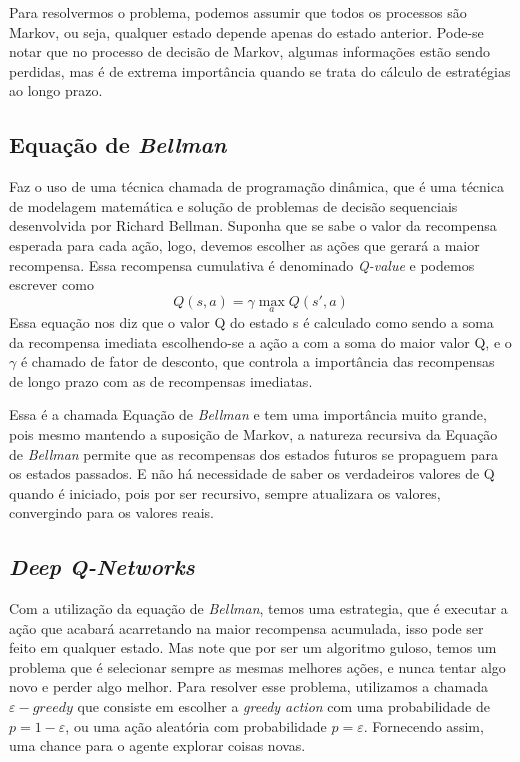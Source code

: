 \documentclass[letterpaper, 10 pt, conference]{ieeeconf}  %
\begin{document}
Para resolvermos o problema, podemos assumir que todos os processos são Markov, ou seja, qualquer estado depende apenas do estado anterior. Pode-se notar que no processo de decisão de Markov, algumas informações estão sendo perdidas, mas é de extrema importância quando se trata do cálculo de estratégias ao longo prazo.

\subsection{Equação de \emph{Bellman}}

Faz o uso de uma técnica chamada de programação dinâmica, que é uma técnica de modelagem matemática e solução de problemas de decisão sequenciais desenvolvida por Richard Bellman. Suponha que se sabe o valor da recompensa esperada para cada ação, logo, devemos escolher as ações que gerará a maior recompensa. Essa recompensa cumulativa é denominado \emph{Q-value} e podemos escrever como
$$Q(s,a)=\gamma \max_a{Q(s',a)}$$
Essa equação nos diz que o valor Q do estado s é calculado como sendo a soma da recompensa imediata escolhendo-se a ação a com a soma do maior valor Q, e o $\gamma$ é chamado de fator de desconto, que controla a importância das recompensas de longo prazo com as de recompensas imediatas.

Essa é a chamada Equação de \emph{Bellman} e tem uma importância muito grande, pois mesmo mantendo a suposição de Markov, a natureza recursiva da Equação de \emph{Bellman} permite que as recompensas dos estados futuros se propaguem para os estados passados. E não há necessidade de saber os verdadeiros valores de Q quando é iniciado, pois por ser recursivo, sempre atualizara os valores, convergindo para os valores reais.

\subsection{\emph{Deep Q-Networks}}

Com a utilização da equação de \emph{Bellman}, temos uma estrategia, que é executar a ação que acabará acarretando na maior recompensa acumulada, isso pode ser feito em qualquer estado. Mas note que por ser um algoritmo guloso, temos um problema que é selecionar sempre as mesmas melhores ações, e nunca tentar algo novo e perder algo melhor. Para resolver esse problema, utilizamos a chamada \emph{$\varepsilon-greedy$} que consiste em escolher a \emph{greedy action} com uma probabilidade de $p=1-\varepsilon$, ou uma ação aleatória com probabilidade $p=\varepsilon$. Fornecendo assim, uma chance para o agente explorar coisas novas.
\end{document}
